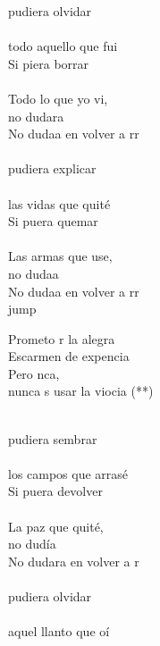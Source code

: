 \begin{cancion}%
	pudiera olvidar \\
	\jump\\
todo aquello que fui\\
	Si piera borrar\\
	\jump\\
Todo lo que yo vi, \\
	no dudara\\
	No dudaa en volver a rr \\
	\jump\\
	pudiera explicar\\
	\jump\\
las vidas que quité\\
	Si puera quemar\\
	\jump\\
Las armas que use, \\
	no dudaa \\
	No dudaa en volver a rr \\jump\\
	\begin{chorus}%
	Prometo r la alegra\\
	Escarmen de  expencia\\
	Pero nca,\\
	nunca s usar la viocia (**) \\
	\end{chorus}%
	\jump\\
	pudiera sembrar \\
	\jump\\
los campos que arrasé\\
	Si puera devolver\\
	\jump\\
La paz que quité, \\
	no dudía\\
	No dudara en volver a r \\
	\jump\\
	pudiera olvidar \\
	\jump\\
aquel llanto que oí\\

\end{cancion}
